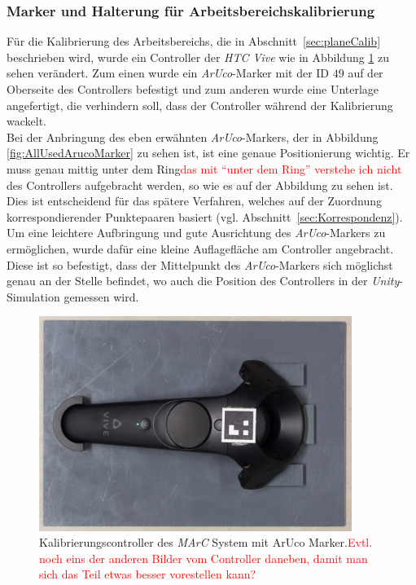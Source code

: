 \subsubsection{Marker und Halterung für Arbeitsbereichskalibrierung} \label{sec:calibController} 
Für die Kalibrierung des Arbeitsbereichs, die in Abschnitt~\ref{sec:planeCalib} beschrieben wird, wurde ein Controller der \textit{HTC Vive} wie in Abbildung \ref{fig:KontrollerMarc} zu sehen verändert. Zum einen wurde ein \textit{ArUco}-Marker mit der ID $49$ auf der Oberseite des Controllers befestigt und zum anderen wurde eine Unterlage angefertigt, die verhindern soll, dass der Controller während der Kalibrierung wackelt.\\
Bei der Anbringung des eben erwähnten \textit{ArUco}-Markers, der in Abbildung \ref{fig:AllUsedArucoMarker} zu sehen ist, ist eine genaue Positionierung wichtig. Er muss genau mittig unter dem Ring\textcolor{red}{das mit "`unter dem Ring"' verstehe ich nicht} des Controllers aufgebracht werden, so wie es auf der Abbildung zu sehen ist. Dies ist entscheidend für das spätere Verfahren, welches auf der Zuordnung korrespondierender Punktepaaren basiert (vgl. Abschnitt~\ref{sec:Korrespondenz}). Um eine leichtere Aufbringung und gute Ausrichtung des \textit{ArUco}-Markers zu ermöglichen, wurde dafür eine kleine Auflagefläche am Controller angebracht. Diese ist so befestigt, dass der Mittelpunkt des \textit{ArUco}-Markers sich möglichst genau an der Stelle befindet, wo auch die Position des Controllers in der \emph{Unity}-Simulation gemessen wird.

	\begin{figure}[H]
		\centering
		\includegraphics[width=4in]{Bilder/Eigene Fotos/IMG_0032.jpg}
		\caption{Kalibrierungscontroller des \textit{MArC} System mit ArUco Marker.\textcolor{red}{Evtl. noch eins der anderen Bilder vom Controller daneben, damit man sich das Teil etwas besser vorestellen kann?}}
		\label{fig:KontrollerMarc}
	\end{figure}
	
